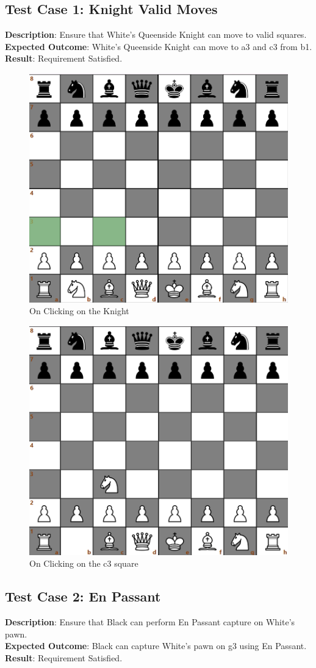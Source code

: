 \documentclass[a4paper,12pt]{article}
\begin{document}
\subsection{Test Case 1: Knight Valid Moves}
\textbf{Description}: Ensure that White's Queenside Knight can move to valid squares.\\
\textbf{Expected Outcome}: White's Queenside Knight can move to a3 and c3 from b1.\\
\textbf{Result}: Requirement Satisfied.

\begin{figure}[H]
    \centering
    \includegraphics[width=0.6\linewidth]{Images/Test Cases/testCase1Img1.png}
    \caption{On Clicking on the Knight}
    \label{fig:BeforeKnightMove}
\end{figure}

\begin{figure}[H]
    \centering
    \includegraphics[width=0.6\linewidth]{Images/Test Cases/testCase1Img2.png}
    \caption{On Clicking on the c3 square}
    \label{fig:AfterKnightMove}
\end{figure}

\subsection{Test Case 2: En Passant}
\textbf{Description}: Ensure that Black can perform En Passant capture on White's pawn.\\
\textbf{Expected Outcome}: Black can capture White's pawn on g3 using En Passant.\\
\textbf{Result}: Requirement Satisfied.
\end{document}
